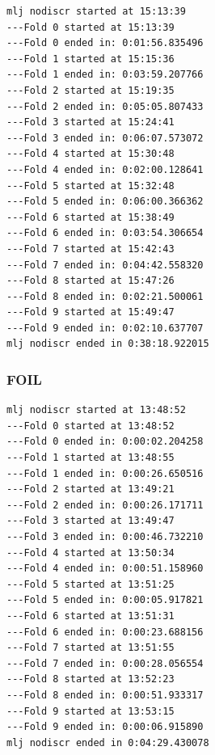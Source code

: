 \begin{verbatim}
mlj nodiscr started at 15:13:39
---Fold 0 started at 15:13:39
---Fold 0 ended in: 0:01:56.835496
---Fold 1 started at 15:15:36
---Fold 1 ended in: 0:03:59.207766
---Fold 2 started at 15:19:35
---Fold 2 ended in: 0:05:05.807433
---Fold 3 started at 15:24:41
---Fold 3 ended in: 0:06:07.573072
---Fold 4 started at 15:30:48
---Fold 4 ended in: 0:02:00.128641
---Fold 5 started at 15:32:48
---Fold 5 ended in: 0:06:00.366362
---Fold 6 started at 15:38:49
---Fold 6 ended in: 0:03:54.306654
---Fold 7 started at 15:42:43
---Fold 7 ended in: 0:04:42.558320
---Fold 8 started at 15:47:26
---Fold 8 ended in: 0:02:21.500061
---Fold 9 started at 15:49:47
---Fold 9 ended in: 0:02:10.637707
mlj nodiscr ended in 0:38:18.922015
\end{verbatim}
\subsubsection{FOIL}


\begin{verbatim}
mlj nodiscr started at 13:48:52
---Fold 0 started at 13:48:52
---Fold 0 ended in: 0:00:02.204258
---Fold 1 started at 13:48:55
---Fold 1 ended in: 0:00:26.650516
---Fold 2 started at 13:49:21
---Fold 2 ended in: 0:00:26.171711
---Fold 3 started at 13:49:47
---Fold 3 ended in: 0:00:46.732210
---Fold 4 started at 13:50:34
---Fold 4 ended in: 0:00:51.158960
---Fold 5 started at 13:51:25
---Fold 5 ended in: 0:00:05.917821
---Fold 6 started at 13:51:31
---Fold 6 ended in: 0:00:23.688156
---Fold 7 started at 13:51:55
---Fold 7 ended in: 0:00:28.056554
---Fold 8 started at 13:52:23
---Fold 8 ended in: 0:00:51.933317
---Fold 9 started at 13:53:15
---Fold 9 ended in: 0:00:06.915890
mlj nodiscr ended in 0:04:29.430078
\end{verbatim}

